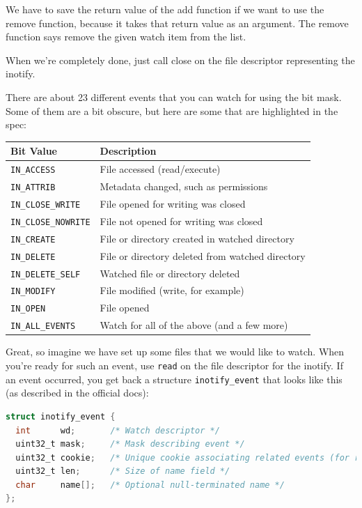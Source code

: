 We have to save the return value of the add function if we want to use the remove function, because it takes that return value as an argument. The remove function says remove the given watch item from the list.

When we're completely done, just call close on the file descriptor representing the inotify.

There are about 23 different events that you can watch for using the bit mask. Some of them are a bit obscure, but here are some that are highlighted in the spec:

\begin{center}
	\begin{tabular}{l|l}
		\textbf{Bit Value}          & \textbf{Description}                             \\ \hline
		\texttt{IN\_ACCESS}         & File accessed (read/execute)                     \\
		\texttt{IN\_ATTRIB}         & Metadata changed, such as permissions            \\
		\texttt{IN\_CLOSE\_WRITE}   & File opened for writing was closed               \\
		\texttt{IN\_CLOSE\_NOWRITE} & File not opened for writing was closed           \\
		\texttt{IN\_CREATE}         & File or directory created in watched directory   \\
		\texttt{IN\_DELETE}         & File or directory deleted from watched directory \\
		\texttt{IN\_DELETE\_SELF}   & Watched file or directory deleted                \\
		\texttt{IN\_MODIFY}         & File modified (write, for example)               \\
		\texttt{IN\_OPEN}           & File opened                                      \\
		\texttt{IN\_ALL\_EVENTS}    & Watch for all of the above (and a few more)
	\end{tabular}
\end{center}

Great, so imagine we have set up some files that we would like to watch. When you're ready for such an event, use \texttt{read} on the file descriptor for the inotify. If an event occurred, you get back a structure \texttt{inotify\_event} that looks like this (as described in the official docs):

\begin{lstlisting}[language=C]
struct inotify_event {
  int      wd;       /* Watch descriptor */
  uint32_t mask;     /* Mask describing event */
  uint32_t cookie;   /* Unique cookie associating related events (for rename(2)) */  
  uint32_t len;      /* Size of name field */
  char     name[];   /* Optional null-terminated name */
};
\end{lstlisting}

